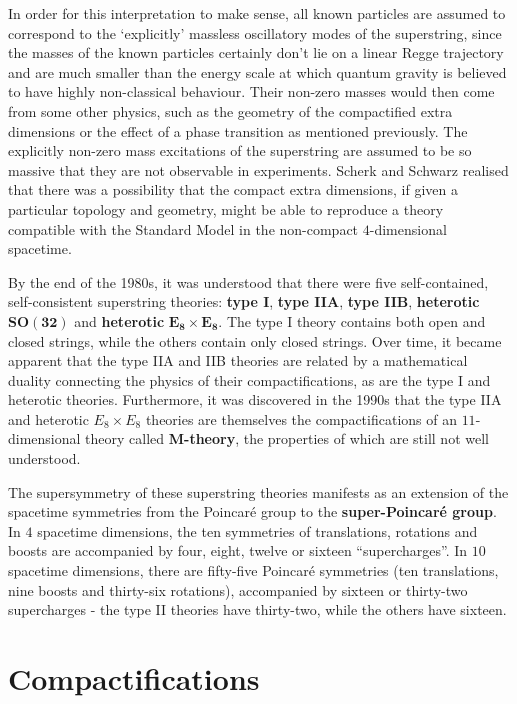 \documentclass[12pt]{article}
\begin{document}
In order for this interpretation to make sense, all known particles are assumed to correspond to the `explicitly' massless oscillatory modes of the superstring, since the masses of the known particles certainly don't lie on a linear Regge trajectory and are much smaller than the energy scale at which quantum gravity is believed to have highly non-classical behaviour. Their non-zero masses would then come from some other physics, such as the geometry of the compactified extra dimensions or the effect of a phase transition as mentioned previously. The explicitly non-zero mass excitations of the superstring are assumed to be so massive that they are not observable in experiments. Scherk and Schwarz realised that there was a possibility that the compact extra dimensions, if given a particular topology and geometry, might be able to reproduce a theory compatible with the Standard Model in the non-compact $4$-dimensional spacetime.
\newline

By the end of the 1980s, it was understood that there were five self-contained, self-consistent superstring theories: \textbf{type I}, \textbf{type IIA}, \textbf{type IIB}, \textbf{heterotic} $\mathbf{SO(32)}$ and \textbf{heterotic} $\mathbf{E_8 \times E_8}$. The type I theory contains both open and closed strings, while the others contain only closed strings. Over time, it became apparent that the type IIA and IIB theories are related by a mathematical duality connecting the physics of their compactifications, as are the type I and heterotic theories. Furthermore, it was discovered in the 1990s that the type IIA and heterotic $E_8 \times E_8$ theories are themselves the compactifications of an $11$-dimensional theory called \textbf{M-theory}, the properties of which are still not well understood.
\newline

The supersymmetry of these superstring theories manifests as an extension of the spacetime symmetries from the Poincaré group to the \textbf{super-Poincaré group}. In $4$ spacetime dimensions, the ten symmetries of translations, rotations and boosts are accompanied by four, eight, twelve or sixteen ``supercharges''. In $10$ spacetime dimensions, there are fifty-five Poincaré symmetries (ten translations, nine boosts and thirty-six rotations), accompanied by sixteen or thirty-two supercharges - the type II theories have thirty-two, while the others have sixteen.

\section{Compactifications}
\end{document}
